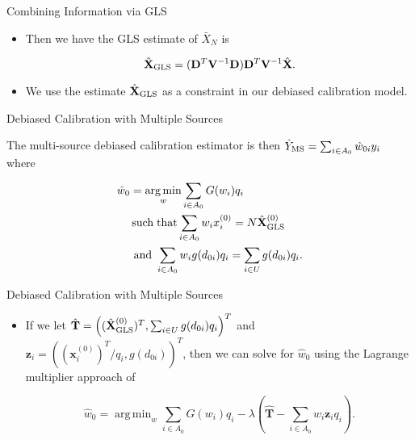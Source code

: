 \documentclass{beamer} %
\DeclareMathOperator*{\argmin}{arg\,min}
\DeclareMathOperator*{\suchthat}{such\; that}
\renewcommand{\bf}[1]{\mathbf{#1}}
\begin{document}
\begin{frame}{Combining Information via GLS}

  \begin{itemize}
    \item Then we have the GLS estimate of $\bar X_N$ is 

      $$\hat{\bf X}_{\rm{GLS}} = (\bf D^T \bf V^{-1} \bf D) \bf D^T \bf V^{-1}
      \hat{\bf X}.$$
    \item We use the estimate $\hat{\bf X}_{\rm{GLS}}$ as a constraint in our
      debiased calibration model.
  \end{itemize}

\end{frame}

\begin{frame}{Debiased Calibration with Multiple Sources}

  The multi-source debiased calibration estimator is then $\hat Y_{\rm{MS}} = \sum_{i
  \in A_0} \hat w_{0i} y_i$ where 

  $$
  \begin{aligned}
    \hat w_0 
    &= \argmin_{w} \sum_{i \in A_0} G(w_i) q_i\\
    &\suchthat \sum_{i \in A_0} w_{i} x_{i}^{(0)} = N\hat{\bf X}_{\rm{GLS}}^{(0)} \\
    &\text{ and } \sum_{i \in A_0} w_i g(d_{0i}) q_i = \sum_{i \in U} g(d_{0i}) q_i.
  \end{aligned}
  $$

\end{frame}

\begin{frame}{Debiased Calibration with Multiple Sources}

  \begin{itemize}
    \item If we let $\hat{\bf T} = \left((\hat{\bf X}_{\rm{GLS}}^{(0)})^T,
        \sum_{i \in U}
      g(d_{0i})q_i\right)^T$ and $\bf z_i = ((\bf x_i^{(0)})^T / q_i, g(d_{0i}))^T$,
      then we can solve for $\hat w_0$ using the Lagrange multiplier approach of 

      \begin{equation}\label{eq:mseq}
      \hat w_0 = \argmin_{w} \sum_{i \in A_0} G(w_i) q_i - \lambda \left(
        \hat{\bf T} - \sum_{i \in A_0} w_{i} \bf z_i q_i \right).
      \end{equation}
  \end{itemize}

\end{frame}
\end{document}
